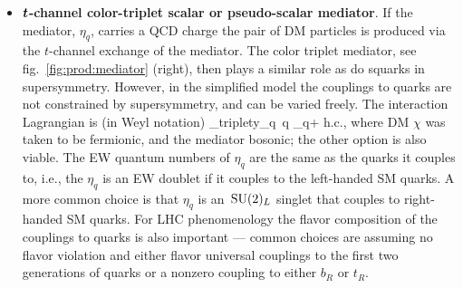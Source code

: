 \begin{itemize}
 $\mathscr{A}(q b\to q' ta)\propto \sqrt{s}$ and $\mathscr{A}(gg\to Z a)\propto \ln^2 s$ diverge in the limit of large center-of-mass energy $\sqrt{s}$. 
 To unitarize the two cross sections $a$ needs to be embedded in a full EW multiplet. 
 The additional diagrams from the exchanges of a charged Higgs, $H^\pm$, which would be part of such an EW multiplet, would make the cross section predictions finite. 
 However, the embedding of $a$ into an EW multiplet is not unique. In principle, there are many viable simplified models for $s$-channel color neutral scalar or pseudo-scalar mediators. For a pseudo-scalar mediator the community has endorsed the use of the simplest choice: a two Higgs doublet with a singlet pseudo-scalar that couples to DM (the 2HDM+$a$ model) \cite{DM:simplified:models:reviews}.  However, it is important to remember that this is by far not the only viable possibility and that the details of LHC exclusions depend on the details of the model, such as the relative importance of the mono-jet ($pp\to j+E_T^{\rm miss}$), mono-Higgs ($pp\to H+E_T^{\rm miss}+X$), mono-$Z$ ($pp\to Z+E_T^{\rm miss}+X$), $pp\to t\bar t +E_T^{\rm miss}$, and $pp\to tX+E_T^{\rm miss}$ channels.   

\item[$\blacktriangleright$] {\bf $\bm{t}$-channel color-triplet scalar or pseudo-scalar mediator}. 
If the mediator, $\eta_q$, carries a QCD charge the pair of DM particles  is produced via the $t$-channel exchange of the mediator. The color triplet mediator, see fig.~\ref{fig:prod:mediator} (right), then plays a similar role as do squarks in supersymmetry. However, in the simplified model 
the couplings to quarks are not constrained by supersymmetry, and can be varied freely. 
The interaction Lagrangian is (in Weyl notation)
\beq
\label{eq:Lint:colormed}
\Lag_{\rm triplet}\supset y_q\,  q \chi\eta_q+ \hbox{h.c.},
\eeq
where DM $\chi$ was taken to be fermionic, and the mediator bosonic; 
the other option is also viable.
The EW quantum numbers of $\eta_q$ are the same as the quarks it couples to, i.e., the $\eta_q$ is an EW doublet if it couples to the left-handed SM quarks. A more common choice is that $\eta_q$ is an $\,{\rm SU}(2)_L$ singlet that couples to right-handed SM quarks.  For LHC phenomenology the flavor composition of the couplings to quarks is also important --- common choices are assuming no flavor violation and either flavor universal couplings to the first two generations of quarks or a nonzero coupling to either $b_R$ or $t_R$. 
\end{itemize}
